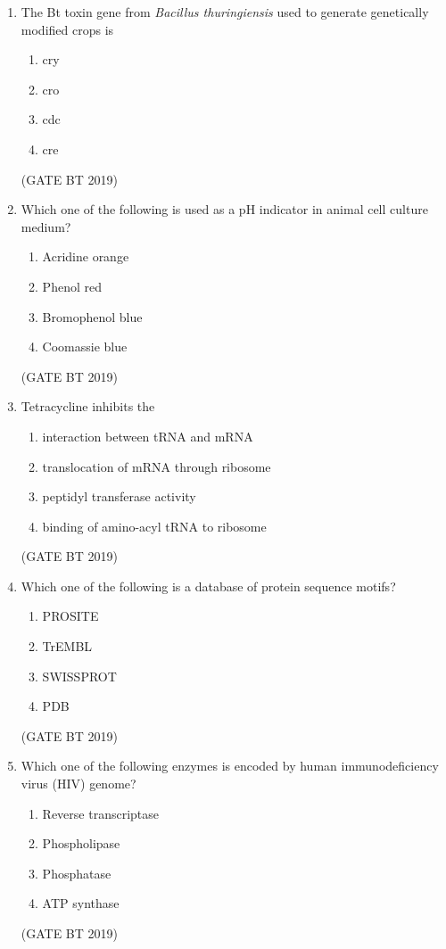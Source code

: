 \documentclass[journal,12pt,onecolumn]{IEEEtran}
\begin{document}
\begin{enumerate}
\item The Bt toxin gene from \textit{Bacillus thuringiensis} used to generate genetically modified crops is
\begin{multicols}{4}
\begin{enumerate}
\item cry
\item cro
\item cdc
\item cre
\end{enumerate}
\end{multicols}\hfill(GATE BT 2019)

\item Which one of the following is used as a pH indicator in animal cell culture medium?
\begin{multicols}{2}
\begin{enumerate}
\item Acridine orange
\item Phenol red
\item Bromophenol blue
\item Coomassie blue
\end{enumerate}
\end{multicols}\hfill(GATE BT 2019)

\item Tetracycline inhibits the
\begin{enumerate}
\item interaction between tRNA and mRNA
\item translocation of mRNA through ribosome
\item peptidyl transferase activity
\item binding of amino-acyl tRNA to ribosome
\end{enumerate}
\hfill(GATE BT 2019)

\item Which one of the following is a database of protein sequence motifs?
\begin{multicols}{4}
\begin{enumerate}
\item PROSITE
\item TrEMBL
\item SWISSPROT
\item PDB
\end{enumerate}
\end{multicols}\hfill(GATE BT 2019)

\item Which one of the following enzymes is encoded by human immunodeficiency virus (HIV) genome?
\begin{multicols}{2}
\begin{enumerate}
\item Reverse transcriptase
\item Phospholipase
\item Phosphatase
\item ATP synthase
\end{enumerate}
\end{multicols}\hfill(GATE BT 2019)


\end{enumerate}
\end{document}
